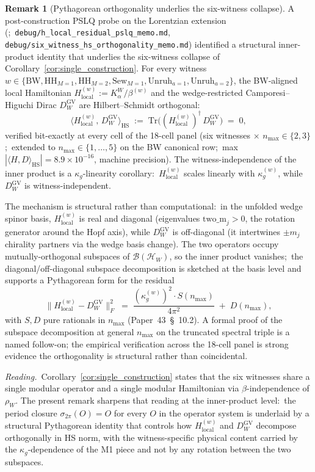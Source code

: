 \documentclass[11pt,a4paper]{article}
\theoremstyle{plain}
\theoremstyle{definition}
\newtheorem{remark}[theorem]{Remark}
\newcommand{\nmax}{n_{\max}}
\newcommand{\Hilb}{\mathcal{H}}
\newcommand{\Tr}{\mathrm{Tr}}
\newcommand{\BW}{\mathrm{BW}}
\newcommand{\HH}{\mathrm{HH}}
\newcommand{\Sew}{\mathrm{Sew}}
\newcommand{\Unruh}{\mathrm{Unruh}}
\begin{document}
\begin{remark}[Pythagorean orthogonality underlies the six-witness
collapse]\label{rem:pythagorean_underlies_collapse}
A post-construction PSLQ probe on the Lorentzian extension
(\cite[\S~10.2,
Cor.~cor:pythagorean\_orthogonality]{paper43};\
\texttt{debug/h\_local\_residual\_pslq\_memo.md},
\texttt{debug/six\_witness\_hs\_orthogonality\_memo.md})
identified a structural inner-product identity that underlies the
six-witness collapse of
Corollary~\ref{cor:single_construction}. For every witness
$w \in \{\BW, \HH_{M=1}, \HH_{M=2}, \Sew_{M=1}, \Unruh_{a=1},
\Unruh_{a=2}\}$, the BW-aligned local Hamiltonian
$H_{\mathrm{local}}^{(w)} := K_\alpha^W / \beta^{(w)}$ and the
wedge-restricted Camporesi--Higuchi Dirac $D_W^{\mathrm{GV}}$ are
Hilbert--Schmidt orthogonal:
$$
   \big\langle H_{\mathrm{local}}^{(w)},\, D_W^{\mathrm{GV}} \big\rangle_{\mathrm{HS}}
   \;:=\; \Tr\!\big( (H_{\mathrm{local}}^{(w)})^\dagger\, D_W^{\mathrm{GV}} \big)
   \;=\; 0,
$$
verified bit-exactly at every cell of the 18-cell panel (six
witnesses $\times$ $\nmax \in \{2, 3\}$;\ extended to $\nmax \in
\{1, \ldots, 5\}$ on the BW canonical row;\ max $|\langle H, D
\rangle_{\mathrm{HS}}| = 8.9\times 10^{-16}$, machine precision).
The witness-independence of the inner product is a
$\kappa_g$-linearity corollary:\ $H_{\mathrm{local}}^{(w)}$ scales
linearly with $\kappa_g^{(w)}$, while $D_W^{\mathrm{GV}}$ is
witness-independent.

The mechanism is structural rather than computational:\ in the
unfolded wedge spinor basis, $H_{\mathrm{local}}^{(w)}$ is real and
diagonal (eigenvalues $\mathrm{two\_m}_j > 0$, the rotation
generator around the Hopf axis), while $D_W^{\mathrm{GV}}$ is
off-diagonal (it intertwines $\pm m_j$ chirality partners via the
wedge basis change). The two operators occupy mutually-orthogonal
subspaces of $\mathcal{B}(\Hilb_W)$, so the inner product vanishes;\
the diagonal/off-diagonal subspace decomposition is sketched at
the basis level and supports a Pythagorean form for the residual
$$
   \big\|H_{\mathrm{local}}^{(w)} - D_W^{\mathrm{GV}}\big\|_F^2
   \;=\; \frac{(\kappa_g^{(w)})^2 \cdot S(\nmax)}{4\pi^2}
       \;+\; D(\nmax),
$$
with $S, D$ pure rationals in $\nmax$ (Paper~43~\S~10.2). A formal
proof of the subspace decomposition at general $\nmax$ on the
truncated spectral triple is a named follow-on; the empirical
verification across the 18-cell panel is strong evidence the
orthogonality is structural rather than coincidental.

\emph{Reading.}\ Corollary~\ref{cor:single_construction} states
that the six witnesses share a single modular operator and a
single modular Hamiltonian via $\beta$-independence of $\rho_W$.
The present remark sharpens that reading at the inner-product
level:\ the period closure $\sigma_{2\pi}(O) = O$ for every $O$
in the operator system is underlaid by a structural Pythagorean
identity that controls how $H_{\mathrm{local}}^{(w)}$ and
$D_W^{\mathrm{GV}}$ decompose orthogonally in HS norm, with the
witness-specific physical content carried by the
$\kappa_g$-dependence of the M1 piece and not by any rotation
between the two subspaces.
\end{remark}
\end{document}
